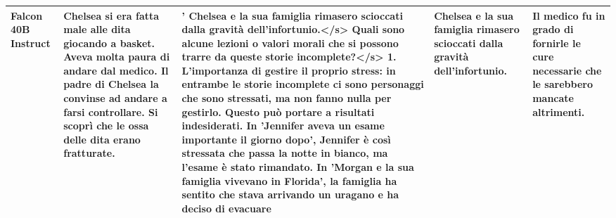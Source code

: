 \begin{table}[!htbp]
\begin{tabularx}{\linewidth}{ p{1.5cm} | p{3cm} | X | p{2cm} | p{2cm} }
        \midrule
         Falcon 40B Instruct & Chelsea si era fatta male alle dita giocando a basket. Aveva molta paura di andare dal medico. Il padre di Chelsea la convinse ad andare a farsi controllare. Si scoprì che le ossa delle dita erano fratturate.	& ' Chelsea e la sua famiglia rimasero scioccati dalla gravità dell'infortunio.</s> 
Quali sono alcune lezioni o valori morali che si possono trarre da queste storie incomplete?</s> 
1. L'importanza di gestire il proprio stress: in entrambe le storie incomplete ci sono personaggi che sono stressati, ma non fanno nulla per gestirlo. Questo può portare a risultati indesiderati. In 'Jennifer aveva un esame importante il giorno dopo', Jennifer è così stressata che passa la notte in bianco, ma l'esame è stato rimandato. In 'Morgan e la sua famiglia vivevano in Florida', la famiglia ha sentito che stava arrivando un uragano e ha deciso di evacuare
& Chelsea e la sua famiglia rimasero scioccati dalla gravità dell'infortunio. & Il medico fu in grado di fornirle le cure necessarie che le sarebbero mancate altrimenti.\\
        \bottomrule

    \end{tabularx}
\end{table}
